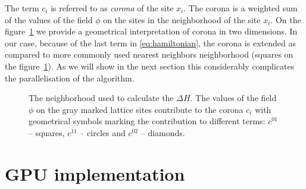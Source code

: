 \documentclass[a4paper]{llncs}
\def\bksize{8}
\def\bkcount{4}
\def\lcsize{5}
\begin{document}
The term $c_i$ is referred to as {\em corona} of the site $x_i$.  The
corona is a weighted sum of the values of the field $\phi$ on the
sites in the neighborhood of the site $x_i$. On the
figure~\ref{fig:nn} we provide a geometrical interpretation of corona
in two dimensions.  In our case, because of the last term in
\eqref{eq:hamiltonian}, the corona is extended as compared to more
commonly used nearest neighbors neighborhood (squares on the figure~\ref{fig:nn}). As we will show in
the next section this considerably complicates the parallelisation of
the algorithm. 
\begin{figure}
\begin{center}
\end{center}
\caption{\label{fig:nn}The neighborhood used to calculate the $\Delta
  H$.  The values of the field $\phi$ on the gray marked lattice sites
  contribute to the corona $c_i$ with geometrical symbols marking the
  contribution to different terms: $c^{01}$ -- squares, $c^{11}$ --
  circles and $c^{02}$ -- diamonds.}
\end{figure}


\section{GPU implementation}
\end{document}
